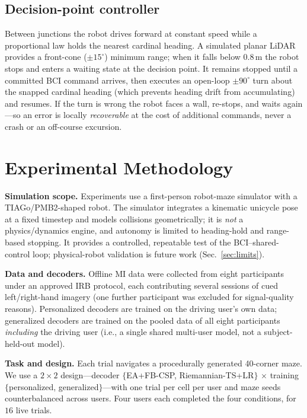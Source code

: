 \documentclass[10pt,journal]{IEEEtran}
\begin{document}
\subsection{Decision-point controller}\label{sec:controller}
Between junctions the robot drives forward at constant speed while a proportional law holds the
nearest cardinal heading. A simulated planar LiDAR provides a front-cone ($\pm15^\circ$) minimum
range; when it falls below $0.8$\,m the robot stops and enters a waiting state at the decision
point. It remains stopped until a committed BCI command arrives, then executes an open-loop
$\pm90^\circ$ turn about the snapped cardinal heading (which prevents heading drift from
accumulating) and resumes. If the turn is wrong the robot faces a wall, re-stops, and waits
again---so an error is locally \emph{recoverable} at the cost of additional commands, never a
crash or an off-course excursion.

\section{Experimental Methodology}\label{sec:method-exp}
\textbf{Simulation scope.} Experiments use a first-person robot-maze simulator with a
TIAGo/PMB2-shaped robot. The simulator integrates a kinematic unicycle pose at a fixed timestep
and models collisions geometrically; it is \emph{not} a physics/dynamics engine, and autonomy is
limited to heading-hold and range-based stopping. It provides a controlled, repeatable test of
the BCI--shared-control loop; physical-robot validation is future work (Sec.~\ref{sec:limits}).

\textbf{Data and decoders.} Offline MI data were collected from eight participants under an
approved IRB protocol, each contributing several sessions of cued left/right-hand imagery (one
further participant was excluded for signal-quality reasons). Personalized decoders are trained
on the driving user's own data; generalized decoders are trained on the pooled data of all eight
participants \emph{including} the driving user (i.e., a single shared multi-user model, not a
subject-held-out model).

\textbf{Task and design.} Each trial navigates a procedurally generated 40-corner maze. We use a
$2{\times}2$ design---decoder $\{$EA+FB-CSP, Riemannian-TS+LR$\}$ $\times$ training
$\{$personalized, generalized$\}$---with one trial per cell per user and maze seeds
counterbalanced across users. Four users each completed the four conditions, for
$16$ live trials.
\end{document}
